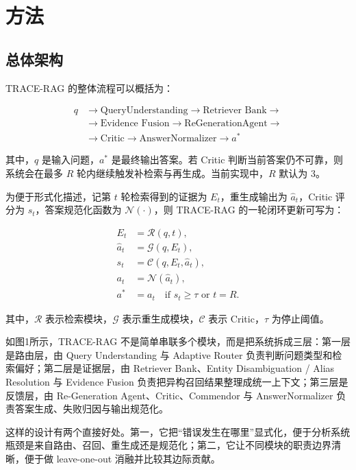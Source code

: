 ﻿\documentclass[UTF8,11pt,twocolumn]{ctexart}
\begin{document}
\section{方法}

\subsection{总体架构}

TRACE-RAG 的整体流程可以概括为：

\[
\begin{aligned}
q &\rightarrow \text{QueryUnderstanding} \rightarrow \text{Retriever Bank} \rightarrow \\
  &\rightarrow \text{Evidence Fusion} \rightarrow \text{ReGenerationAgent} \rightarrow \\
  &\rightarrow \text{Critic} \rightarrow \text{AnswerNormalizer} \rightarrow a^*
\end{aligned}
\]

其中，$q$ 是输入问题，$a^*$ 是最终输出答案。若 Critic 判断当前答案仍不可靠，则系统会在最多 $R$ 轮内继续触发补检索与再生成。当前实现中，$R$ 默认为 3。

为便于形式化描述，记第 $t$ 轮检索得到的证据为 $E_t$，重生成输出为 $\hat{a}_t$，Critic 评分为 $s_t$，答案规范化函数为 $\mathcal{N}(\cdot)$，则 TRACE-RAG 的一轮闭环更新可写为：

\[
\begin{aligned}
E_t &= \mathcal{R}(q, t), \\
\hat{a}_t &= \mathcal{G}(q, E_t), \\
s_t &= \mathcal{C}(q, E_t, \hat{a}_t), \\
a_t &= \mathcal{N}(\hat{a}_t), \\
a^* &= a_t \quad \text{if } s_t \ge \tau \text{ or } t = R .
\end{aligned}
\]

其中，$\mathcal{R}$ 表示检索模块，$\mathcal{G}$ 表示重生成模块，$\mathcal{C}$ 表示 Critic，$\tau$ 为停止阈值。

如图1所示，TRACE-RAG 不是简单串联多个模块，而是把系统拆成三层：第一层是路由层，由 Query Understanding 与 Adaptive Router 负责判断问题类型和检索偏好；第二层是证据层，由 Retriever Bank、Entity Disambiguation / Alias Resolution 与 Evidence Fusion 负责把异构召回结果整理成统一上下文；第三层是反馈层，由 Re-Generation Agent、Critic、Commendor 与 AnswerNormalizer 负责答案生成、失败归因与输出规范化。

这样的设计有两个直接好处。第一，它把“错误发生在哪里”显式化，便于分析系统瓶颈是来自路由、召回、重生成还是规范化；第二，它让不同模块的职责边界清晰，便于做 leave-one-out 消融并比较其边际贡献。
\end{document}
